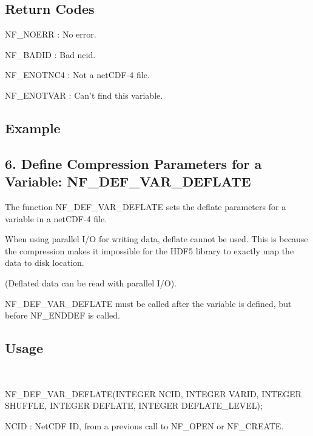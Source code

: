 \subsection*{Return Codes }

{\ttfamily N\+F\+\_\+\+N\+O\+E\+RR} \+: No error.

{\ttfamily N\+F\+\_\+\+B\+A\+D\+ID} \+: Bad ncid.

{\ttfamily N\+F\+\_\+\+E\+N\+O\+T\+N\+C4} \+: Not a net\+C\+D\+F-\/4 file.

{\ttfamily N\+F\+\_\+\+E\+N\+O\+T\+V\+AR} \+: Can’t find this variable.

\subsection*{Example }

\subsection*{6. Define Compression Parameters for a Variable\+: {\ttfamily N\+F\+\_\+\+D\+E\+F\+\_\+\+V\+A\+R\+\_\+\+D\+E\+F\+L\+A\+TE} }

The function N\+F\+\_\+\+D\+E\+F\+\_\+\+V\+A\+R\+\_\+\+D\+E\+F\+L\+A\+TE sets the deflate parameters for a variable in a net\+C\+D\+F-\/4 file.

When using parallel I/O for writing data, deflate cannot be used. This is because the compression makes it impossible for the H\+D\+F5 library to exactly map the data to disk location.

(Deflated data can be read with parallel I/O).

N\+F\+\_\+\+D\+E\+F\+\_\+\+V\+A\+R\+\_\+\+D\+E\+F\+L\+A\+TE must be called after the variable is defined, but before N\+F\+\_\+\+E\+N\+D\+D\+EF is called.

\subsection*{Usage }

 

N\+F\+\_\+\+D\+E\+F\+\_\+\+V\+A\+R\+\_\+\+D\+E\+F\+L\+A\+TE(I\+N\+T\+E\+G\+ER N\+C\+ID, I\+N\+T\+E\+G\+ER V\+A\+R\+ID, I\+N\+T\+E\+G\+ER S\+H\+U\+F\+F\+LE, I\+N\+T\+E\+G\+ER D\+E\+F\+L\+A\+TE, I\+N\+T\+E\+G\+ER D\+E\+F\+L\+A\+T\+E\+\_\+\+L\+E\+V\+EL);

{\ttfamily N\+C\+ID} \+: Net\+C\+DF ID, from a previous call to N\+F\+\_\+\+O\+P\+EN or N\+F\+\_\+\+C\+R\+E\+A\+TE.

